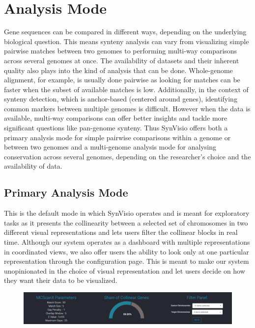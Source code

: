 \section{Analysis Mode}
Gene sequences can be compared in different ways, depending on the underlying biological question. This means synteny analysis can vary from visualizing simple pairwise matches between two genomes to performing  multi-way comparisons across several genomes at once. The availability of datasets and their inherent quality also plays into the kind of analysis that can be done. Whole-genome alignment, for example, is usually done pairwise as looking for matches can be faster when the subset of available matches is low. Additionally, in the context of synteny detection, which is anchor-based (centered around genes), identifying common markers between multiple genomes is difficult\cite{wang2012mcscanx}. However when the data is available, multi-way comparisons can offer better insights and tackle more significant questions like pan-genome synteny. Thus SynVisio offers both a primary analysis mode for simple pairwise comparisons within a genome or between two genomes and a multi-genome analysis mode for analysing conservation across several genomes, depending on the researcher's choice and the availability of data.

\subsection{Primary Analysis Mode}
This is the default mode in which SynVisio operates and is meant for exploratory tasks as it presents the collinearity between a selected set of chromosomes in two different visual representations and lets users filter the collinear blocks in real time. Although our system operates as a dashboard with multiple representations in coordinated views, we also offer users the ability to look only at one particular representation through the configuration page. This is meant to make our system unopinionated in the choice of visual representation and let users decide on how they want their data to be visualized. 

\begin{figure}
  \centering
  \includegraphics[width=1\linewidth]{images/ch_5_baseparameters.PNG}
  \label{fig:ch_5_baseparameters}
\end{figure}


